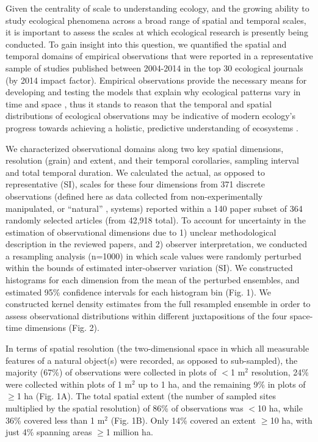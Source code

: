 \documentclass[12pt]{article}
\begin{document}
Given the centrality of scale to understanding ecology, and the growing ability to study ecological phenomena across a broad range of spatial and temporal scales, it is important to assess the scales at which ecological research is presently being conducted. To gain insight into this question, we quantified the spatial and temporal domains of empirical observations that were reported in a representative sample of studies published between 2004-2014 in the top 30 ecological journals (by 2014 impact factor). Empirical observations provide the necessary means for developing and testing the models that explain why ecological patterns vary in time and space \cite{levin_problem_1992, tilman_ecological_1989}, thus it stands to reason that the temporal and spatial distributions of ecological observations may be indicative of modern ecology's progress towards achieving a holistic, predictive understanding of ecosystems \cite{chave_problem_2013,levin_problem_1992}. 

We characterized observational domains along two key spatial dimensions, resolution (grain) and extent, and their temporal corollaries, sampling interval and total temporal duration. We calculated the actual, as opposed to representative (SI), scales for these four dimensions from 371 discrete observations (defined here as data collected from non-experimentally manipulated, or ``natural'' \cite{tilman_ecological_1989}, systems) reported within a 140 paper subset of 364 randomly selected articles (from 42,918 total). To account for uncertainty in the estimation of observational dimensions due to 1) unclear methodological description in the reviewed papers, and 2) observer interpretation, we conducted a resampling analysis (n=1000) in which scale values were randomly perturbed within the bounds of estimated inter-observer variation (SI). We constructed histograms for each dimension from the mean of the perturbed ensembles, and estimated 95\% confidence intervals for each histogram bin (Fig. 1). We constructed  kernel density estimates from the full resampled ensemble in order to assess observational distributions within different juxtapositions of the four space-time dimensions (Fig. 2). 

In terms of spatial resolution (the two-dimensional space in which all measurable features of a natural object(s) were recorded, as opposed to sub-sampled), the majority (67\%) of observations were collected in plots of $<$1 m$^2$ resolution, 24\% were collected within plots of 1 m$^2$ up to 1 ha, and the remaining 9\% in plots of $\geq$1 ha (Fig. 1A). The total spatial extent (the number of sampled sites multiplied by the spatial resolution) of 86\% of observations was $<$10 ha, while 36\% covered less than 1 m$^2$ (Fig. 1B). Only 14\% covered an extent $\geq$10 ha, with just 4\% spanning areas $\geq$1 million ha. 
\end{document}

